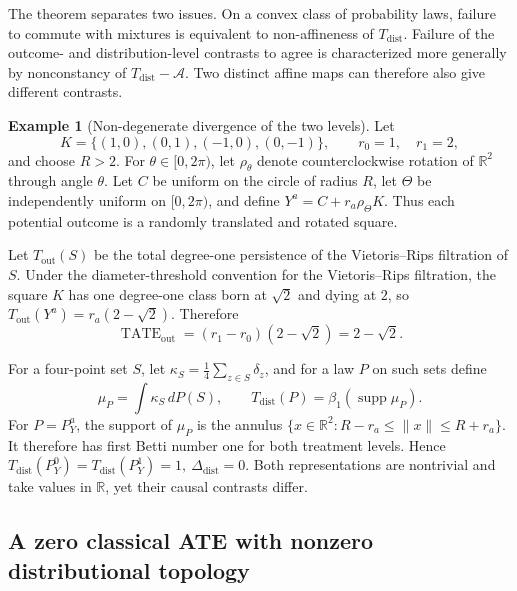 \documentclass[11pt,a4paper]{article}
\theoremstyle{plain}
\theoremstyle{definition}
\newtheorem{example}[theorem]{Example}
\theoremstyle{remark}
\newcommand{\1}{\mathbbm{1}}
\begin{document}
The theorem separates two issues. On a convex class of probability laws, failure to commute with mixtures is equivalent to non-affineness of \(T_{\mathrm{dist}}\). Failure of the outcome- and distribution-level contrasts to agree is characterized
more generally by nonconstancy of \(T_{\mathrm{dist}}-\mathcal A\). Two distinct affine maps can therefore also give different contrasts.

\begin{example}[Non-degenerate divergence of the two levels]
\label{ex:nondegenerate-noncommutation}
Let
\[
K=\{(1,0),(0,1),(-1,0),(0,-1)\},
\qquad
r_0=1,\quad r_1=2,
\]
and choose \(R>2\). For \(\theta\in[0,2\pi)\), let \(\rho_\theta\) denote counterclockwise rotation of \(\mathbb R^2\) through angle \(\theta\). Let \(C\) be uniform on the circle of radius \(R\), let \(\Theta\) be independently uniform on \([0,2\pi)\), and define \(Y^a=C+r_a\rho_\Theta K\). Thus each potential outcome is a randomly translated and rotated square.

Let \(T_{\mathrm{out}}(S)\) be the total degree-one persistence of the Vietoris--Rips filtration of \(S\). Under the diameter-threshold convention for the Vietoris--Rips filtration, the square \(K\) has one degree-one class born at \(\sqrt2\) and dying at \(2\), so \(T_{\mathrm{out}}(Y^a) = r_a(2-\sqrt2)\). Therefore
\[
\operatorname{TATE}_{\mathrm{out}}
=
(r_1-r_0)(2-\sqrt2)
=
2-\sqrt2.
\]

For a four-point set \(S\), let \(\kappa_S=\frac14\sum_{z\in S}\delta_z\), and for a law \(P\) on such sets define
\[
\mu_P=\int\kappa_S\,dP(S),
\qquad
T_{\mathrm{dist}}(P)
=
\beta_1(\operatorname{supp}\mu_P).
\]
For \(P=P_Y^a\), the support of \(\mu_P\) is the annulus
\(\{x\in\mathbb R^2:R-r_a\leq\|x\|\leq R+r_a\}\). It therefore has first Betti number one for both treatment levels. Hence \(T_{\mathrm{dist}}(P_Y^0) = T_{\mathrm{dist}}(P_Y^1) = 1,\ \Delta_{\mathrm{dist}}=0\). Both representations are nontrivial and take values in \(\mathbb R\), yet their causal contrasts differ.
\end{example}

\subsection{A zero classical ATE with nonzero distributional topology}
\label{subsec:zero-ate-nonzero-topology}
\end{document}
